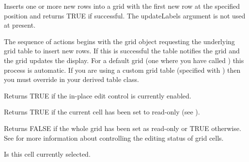 
Inserts one or more new rows into a grid with the first new row at the specified
position and returns TRUE if successful. The updateLabels argument is not used at
present. 

The sequence of actions begins with the grid object requesting the underlying grid
table to insert new rows. If this is successful the table notifies the grid and the
grid updates the display. For a default grid (one where you have called 
) this process is automatic. If you are
using a custom grid table (specified with ) 
then you must override 
 in your derived
table class.

\label{wxgridiscelleditcontrolenabled}


Returns TRUE if the in-place edit control is currently enabled.

\label{wxgridiscurrentcellreadonly}


Returns TRUE if the current cell has been set to read-only
(see ).

\label{wxgridiseditable}


Returns FALSE if the whole grid has been set as read-only or TRUE otherwise.
See  for more information about
controlling the editing status of grid cells.

\label{wxgridisinselection}



Is this cell currently selected.

\label{wxgridisreadonly}


